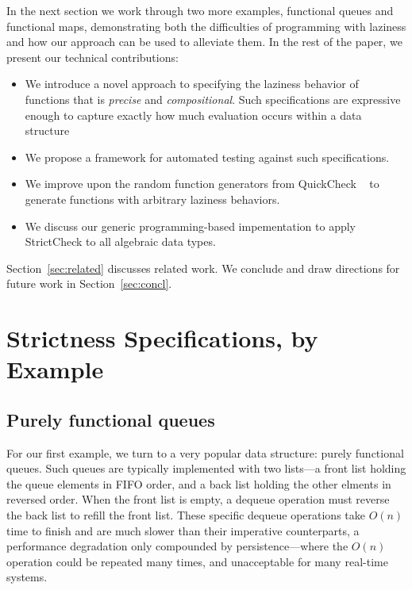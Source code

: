 \documentclass[acmsmall,review]{acmart}\settopmatter{}
\begin{document}
In the next section we work through two more examples, functional
queues and functional maps, demonstrating both the difficulties of
programming with laziness and how our approach can be used to
alleviate them.
%
In the rest of the paper, we present our technical contributions:
\begin{itemize}
\item We introduce a novel approach to specifying the laziness behavior
of functions that is {\em precise} and {\em compositional}. Such
specifications are expressive enough to capture exactly how much
evaluation occurs within a data structure
\item We propose a framework for automated testing against such specifications.
\item We improve upon the random function generators from QuickCheck ~\cite{Claessen:2000:QLT:357766.351266} to generate functions with arbitrary laziness behaviors.
\item We discuss our generic programming-based impementation to apply StrictCheck to all algebraic data types.
\end{itemize}
%
Section~\ref{sec:related} discusses related work. We conclude and draw
directions for future work in Section~\ref{sec:concl}.

\section{Strictness Specifications, by Example}
\label{sec:examples}

\subsection{Purely functional queues}
\label{sec:queues}

For our first example, we turn to a very popular data structure:
purely functional queues.  Such queues are typically implemented with
two lists---a front list holding the queue elements in FIFO order, and
a back list holding the other elments in reversed order. When the
front list is empty, a dequeue operation must reverse the back list to
refill the front list. These specific dequeue operations take $O(n)$
time to finish and are much slower than their imperative
counterparts, a performance degradation only compounded by
persistence---where the $O(n)$ operation could be repeated many times,
and unacceptable for many real-time systems.
\end{document}
